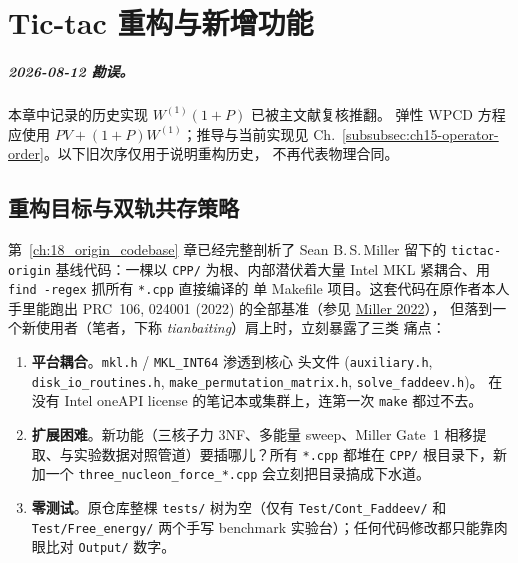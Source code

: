 
\chapter{Tic-tac 重构与新增功能}
\label{ch:19_refactor_evolution}

\paragraph{2026-08-12 勘误。}
本章中记录的历史实现 \(W^{(1)}(1+P)\) 已被主文献复核推翻。
弹性 WPCD 方程应使用 \(PV+(1+P)W^{(1)}\)；推导与当前实现见
Ch.~\ref{subsubsec:ch15-operator-order}。以下旧次序仅用于说明重构历史，
不再代表物理合同。

\section{重构目标与双轨共存策略}
\label{sec:19:goals}

第~\ref{ch:18_origin_codebase} 章已经完整剖析了 Sean B.\,S.\,Miller 留下的
\texttt{tictac-origin} 基线代码：一棵以 \texttt{CPP/} 为根、内部潜伏着大量
Intel MKL 紧耦合、用 \texttt{find -regex} 抓所有 \texttt{*.cpp} 直接编译的
单 Makefile 项目。这套代码在原作者本人手里能跑出 PRC~106, 024001 (2022)
的全部基准（参见
\href{https://journals.aps.org/prc/abstract/10.1103/PhysRevC.106.024001}{Miller 2022}），
但落到一个新使用者（笔者，下称 \emph{tianbaiting}）肩上时，立刻暴露了三类
痛点：

\begin{enumerate}
\item \textbf{平台耦合}。\texttt{mkl.h} / \texttt{MKL\_INT64} 渗透到核心
      头文件 (\texttt{auxiliary.h}, \texttt{disk\_io\_routines.h},
      \texttt{make\_permutation\_matrix.h}, \texttt{solve\_faddeev.h})。
      在没有 Intel oneAPI license 的笔记本或集群上，连第一次 \texttt{make}
      都过不去。
\item \textbf{扩展困难}。新功能（三核子力 3NF、多能量 sweep、Miller Gate~1
      相移提取、与实验数据对照管道）要插哪儿？所有 \texttt{*.cpp} 都堆在
      \texttt{CPP/} 根目录下，新加一个 \texttt{three\_nucleon\_force\_*.cpp}
      会立刻把目录搞成下水道。
\item \textbf{零测试}。原仓库整棵 \texttt{tests/} 树为空（仅有
      \texttt{Test/Cont\_Faddeev/} 和 \texttt{Test/Free\_energy/} 两个手写
      benchmark 实验台）；任何代码修改都只能靠肉眼比对 \texttt{Output/}
      数字。
\end{enumerate}


